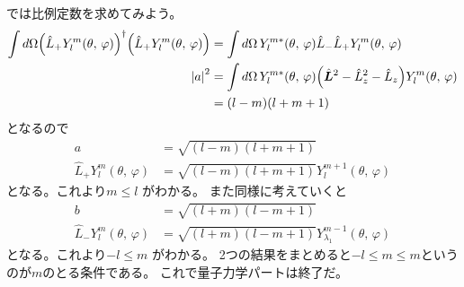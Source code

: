 \documentclass[../../master.tex]{subfiles}
\begin{document}
では比例定数を求めてみよう。
\begin{equation}\begin{aligned}[b]
    \int d\Omega\qty(\hat{L}_+ Y_{l}^m(\theta,\,\varphi))^\dagger
	\qty(\hat{L}_+ Y_{l}^m(\theta,\,\varphi))
	          & = \int d\Omega\, Y_{l}^{m*}(\theta,\,\varphi)\hat{L}_-\hat{L}_+Y_{l}^m(\theta,\,\varphi)                           \\
	\abs{a}^2 & =\int d\Omega\, Y_{l}^{m*}(\theta,\,\varphi)\qty(\hat{\vb*{L}}^2 -\hat{L}_z^2 -\hat{L}_z)Y_{l}^m(\theta,\,\varphi) \\
	          & =(l-m)(l+m+1)
\end{aligned}\end{equation}
となるので
\begin{align}
	a                                & = \sqrt{(l-m)(l+m+1)}                            \\
	\hat{L}_+Y_l^m(\theta,\,\varphi) & = \sqrt{(l-m)(l+m+1)}Y_l^{m+1}(\theta,\,\varphi)
\end{align}
となる。これより\(m\leq l\) がわかる。
また同様に考えていくと
\begin{align}
	b                                & = \sqrt{(l+m)(l-m+1)}                                      \\
	\hat{L}_-Y_l^m(\theta,\,\varphi) & = \sqrt{(l+m)(l-m+1)}Y_{\lambda_1}^{m-1}(\theta,\,\varphi)
\end{align}
となる。これより\(-l\leq m\) がわかる。
2つの結果をまとめると\(-l \leq m \leq m\)というのが\(m\)のとる条件である。
これで量子力学パートは終了だ。
\end{document}
